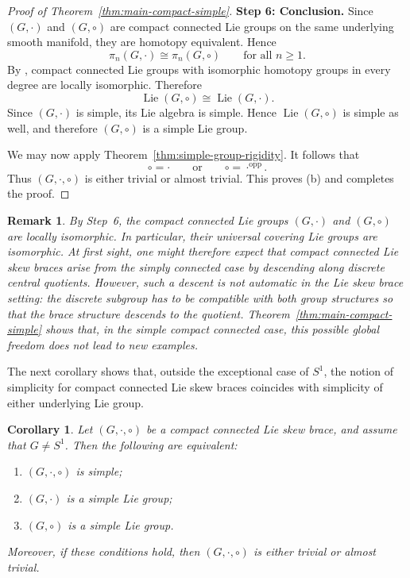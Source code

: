 \documentclass[reqno]{amsart}
\newtheorem{corollary}[theorem]{Corollary}
\newtheorem{remark}[theorem]{Remark}
\DeclareMathOperator{\Lie}{Lie}
\begin{document}
\begin{proof}[Proof of Theorem~\ref{thm:main-compact-simple}]
\medskip
\noindent
\textbf{Step 6: Conclusion.}
Since \((G,\cdot)\) and \((G,\circ)\) are compact connected Lie groups on the
same underlying smooth manifold, they are homotopy equivalent. Hence
\[
\pi_n(G,\cdot)\cong \pi_n(G,\circ)
\qquad\text{for all }n\ge 1.
\]
By \cite[Thm.~2]{Boekholt1998}, compact connected Lie groups with isomorphic
homotopy groups in every degree are locally isomorphic. Therefore
\[
\Lie(G,\circ)\cong \Lie(G,\cdot).
\]
Since \((G,\cdot)\) is simple, its Lie algebra is simple. Hence
\(\Lie(G,\circ)\) is simple as well, and therefore \((G,\circ)\) is a simple
Lie group.

We may now apply Theorem~\ref{thm:simple-group-rigidity}. It follows that
\[
\circ=\cdot
\qquad\text{or}\qquad
\circ=\cdot^{\mathrm{opp}}.
\]
Thus \((G,\cdot,\circ)\) is either trivial or almost trivial. This proves
\textup{(b)} and completes the proof.
\end{proof}


\begin{remark}\rm
By Step~6, the compact connected Lie groups \((G,\cdot)\) and \((G,\circ)\)
are locally isomorphic. In particular, their universal covering Lie groups are
isomorphic.
At first sight, one might therefore expect that compact connected Lie skew
braces arise from the simply connected case by descending along discrete
central quotients. However, such a descent is not automatic in the Lie skew
brace setting: the discrete subgroup has to be compatible with both group
structures so that the brace structure descends to the quotient.
Theorem~\ref{thm:main-compact-simple} shows that, in the simple compact
connected case, this possible global freedom does not lead to new examples.
\end{remark}


The next corollary shows that, outside the exceptional case of $S^1$, the
notion of simplicity for compact connected Lie skew braces coincides with
simplicity of either underlying Lie group.

\begin{corollary}\label{cor:compact-simple-equivalence}
Let $(G,\cdot,\circ)$ be a compact connected Lie skew brace, and assume that
$G\neq S^1$.
Then the following are equivalent:
\begin{enumerate}[label=\textup{(\roman*)}]
    \item $(G,\cdot,\circ)$ is simple;
    \item $(G,\cdot)$ is a simple Lie group;
    \item $(G,\circ)$ is a simple Lie group.
\end{enumerate}
Moreover, if these conditions hold, then $(G,\cdot,\circ)$ is either trivial or
almost trivial.
\end{corollary}
\end{document}
